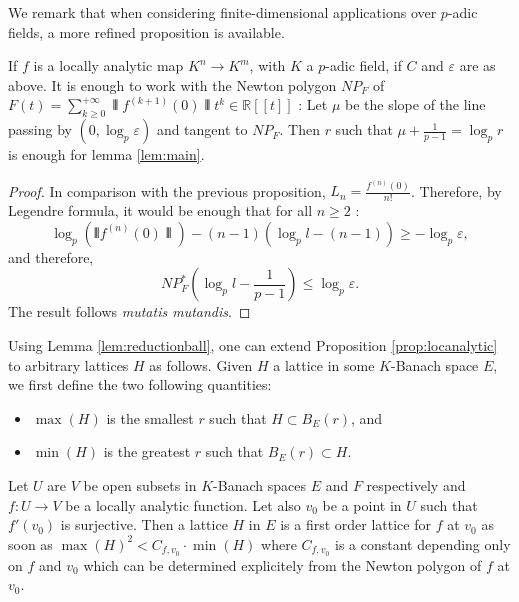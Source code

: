\documentclass{lms}
\begin{document}
We remark that when considering finite-dimensional applications over $p$-adic fields, a more refined proposition is available.

\begin{prop} \label{prop:locanalyticfinitedim}
If $f$ is a locally analytic map $K^n \rightarrow K^m$, with $K$ a $p$-adic field, if $C$ and $\varepsilon$ are as above. It is enough to work with the Newton polygon $NP_F$ of $F(t) = \sum_{k\geq 0}^{+\infty} \interleave f^{(k+1)}(0) \interleave  t^k \in \mathbb{R}[[t]]$ : Let $\mu$ be the slope of the line passing by $(0, \log_p \varepsilon)$ and tangent to $NP_F$.
Then $r$ such that $\mu+\frac{1}{p-1}=\log_p r$ is enough for lemma \ref{lem:main}. 
\end{prop}
\begin{proof}
In comparison with the previous proposition, $L_n=\frac{f^{(n)}(0)}{n!}$. Therefore, by Legendre formula, it would be enough that for all $n \geq 2$ :
\[\log_p (\interleave f^{(n)}(0) \interleave )-(n-1) (\log_p l-(n-1)) \geq - \log_p \varepsilon,\]
and therefore, \[ NP_F^* \left( \log_p l - \frac{1}{p-1} \right) \leq \log_p \varepsilon.\]
The result follows \textit{mutatis mutandis}.
\end{proof}


Using Lemma \ref{lem:reductionball}, one can extend Proposition 
\ref{prop:locanalytic} to arbitrary lattices $H$ as follows. Given $H$
a lattice in some $K$-Banach space $E$, we first define the two
following quantities:
\begin{itemize}
\item $\max(H)$ is the smallest $r$ such that $H \subset B_E(r)$, and
\item $\min(H)$ is the greatest $r$ such that $B_E(r) \subset H$.
\end{itemize}

\begin{cor}
Let $U$ are $V$ be open subsets in $K$-Banach spaces $E$ and $F$ 
respectively and $f : U \to V$ be a locally analytic function. Let 
also $v_0$ be a point in $U$ such that $f'(v_0)$ is surjective. 
Then a lattice $H$ in $E$ is a first order lattice for $f$ at $v_0$ as 
soon as $\max(H)^2 < C_{f, v_0} \cdot \min(H)$ where $C_{f, v_0}$ is a 
constant depending only on $f$ and $v_0$ which can be determined 
explicitely from the Newton polygon of $f$ at $v_0$.
\end{cor}
\end{document}
